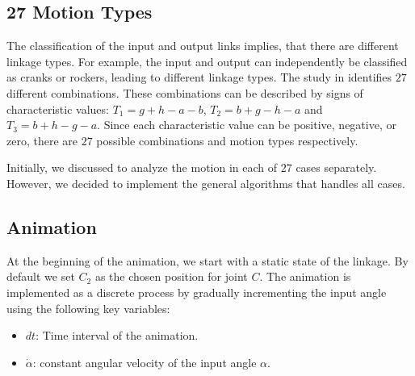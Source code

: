 \documentclass{article}
\begin{document}
 \subsection{27 Motion Types}\label{ch:27_motion_types}
 
 The classification of the input and output links implies, that there are different linkage types. For example, the input and output can independently be classified as cranks or rockers, leading to different linkage types. The study in \cite{inproceedings} identifies $27$ different combinations. These combinations can be described by signs of characteristic values: $T_1 = g + h - a - b$, $T_2 = b + g - h - a$ and $T_3 = b + h - g - a$. Since each characteristic value can be positive, negative, or zero, there are $27$ possible combinations and motion types respectively.
 
 Initially, we discussed to analyze the motion in each of $27$ cases separately. However, we decided to implement the general algorithms that handles all cases.
 

 \subsection{Animation}\label{ch:animation}

 At the beginning of the animation, we start with a static state of the linkage. By default we set $C_2$ as the chosen position for joint $C$.
 The animation is implemented as a discrete process by gradually incrementing the input angle using the following key variables:
 \begin{itemize}
 	\item $dt$: Time interval of the animation.
 	\item $\dot{\alpha}$: constant angular velocity of the input angle $\alpha$.
 \end{itemize}
\end{document}
